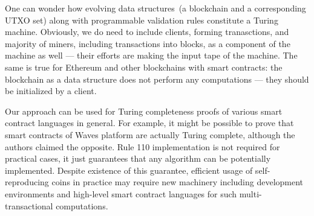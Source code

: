 \documentclass[runningheads]{llncs}
\begin{document}
    One can wonder how evolving data structures~(a blockchain and a
    corresponding UTXO set) along with programmable validation rules constitute
    a Turing machine. Obviously, we do need to include clients, forming tranasctions,
    and majority of miners, including transactions into blocks, as a
    component of the machine as well --- their efforts are making the input tape of
    the machine. The same is true for Ethereum and other blockchains with smart
    contracts: the blockchain as a data structure does not perform any
    computations --- they should be initialized by a client.



    Our approach can be used for Turing completeness
    proofs of various smart contract languages in general. For example, it might be
    possible to prove
    that smart contracts of Waves platform \cite{wavesSmarts} are actually
    Turing complete, although the authors claimed the opposite.
    Rule 110 implementation is not required for practical cases, it just
    guarantees that any algorithm can be potentially implemented.
    Despite existence of this guarantee, efficient usage of
    self-reproducing coins in practice may require new machinery including development
    environments and high-level smart contract languages for
    such multi-transactional computations.

\end{document}
